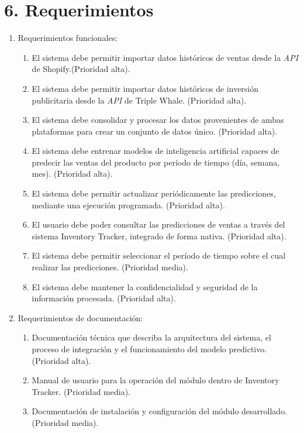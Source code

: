 \documentclass[
11pt, %
]{charter}
\begin{document}
\section{6. Requerimientos}
\label{sec:requerimientos}


\begin{enumerate}
	\item Requerimientos funcionales:
		\begin{enumerate}
			\item  El sistema debe permitir importar datos históricos de ventas desde la \textit{API} de Shopify.(Prioridad alta).
			\item El sistema debe permitir importar datos históricos de inversión publicitaria desde la \textit{API} de Triple Whale. (Prioridad alta).
			\item El sistema debe consolidar y procesar los datos provenientes de ambas plataformas para crear un conjunto de datos único. (Prioridad alta).
			\item El sistema debe entrenar modelos de inteligencia artificial capaces de predecir las ventas del producto por período de tiempo (día, semana, mes). (Prioridad alta).
			\item El sistema debe permitir actualizar periódicamente las predicciones, mediante una ejecución programada. (Prioridad alta).
			\item El usuario debe poder consultar las predicciones de ventas a través del sistema Inventory Tracker, integrado de forma nativa. (Prioridad alta).
			\item El sistema debe permitir seleccionar el período de tiempo sobre el cual realizar las predicciones. (Prioridad media).
			\item El sistema debe mantener la confidencialidad y seguridad de la información procesada. (Prioridad alta).
		\end{enumerate}
	\item Requerimientos de documentación:
		\begin{enumerate}
			\item Documentación técnica que describa la arquitectura del sistema, el proceso de integración y el funcionamiento del modelo predictivo. (Prioridad alta).
			\item Manual de usuario para la operación del módulo dentro de Inventory Tracker. (Prioridad media).
			\item Documentación de instalación y configuración del módulo desarrollado. (Prioridad media).
		

\end{enumerate}
\end{enumerate}
\end{document}
